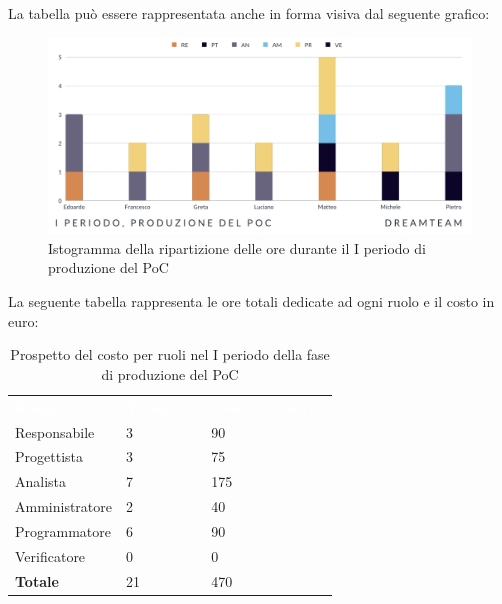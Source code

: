 La tabella può essere rappresentata anche in forma visiva dal seguente grafico:
\begin{figure}[!h]
\centering
\includegraphics[scale=0.65]{Sezioni/SezioniPreventivo/grafici/Poc_I_periodo.png}
\caption{Istogramma della ripartizione delle ore durante il I periodo di produzione del PoC}
\end{figure}

La seguente tabella rappresenta le ore totali dedicate ad ogni ruolo e il costo in euro:

\begin{table}[!htbp]
\begin{center}
\renewcommand{\arraystretch}{1.5}
\begin{tabular}{ m{}<{\centering}  m{}<{\centering} m{}<{\centering}}
	\rowcolor{darkblue}
	\textcolor{white}{\textbf{Ruolo}}&\textcolor{white}{\textbf{Totale ore}}&\textcolor{white}{\textbf{Costo totale (\euro)}}\\ 

	Responsabile  & 3 & 90 \\	
	
	Progettista & 3 & 75 \\
	
	Analista & 7 & 175 \\

	Amministratore & 2 & 40 \\
	
	Programmatore & 6 & 90 \\
	
	Verificatore & 0 & 0 \\
	
	\textbf{Totale} & 21 & 470 \\
	
\end{tabular}
\caption{Prospetto del costo per ruoli nel I periodo della fase di produzione del PoC}
\end{center}
\end{table}

